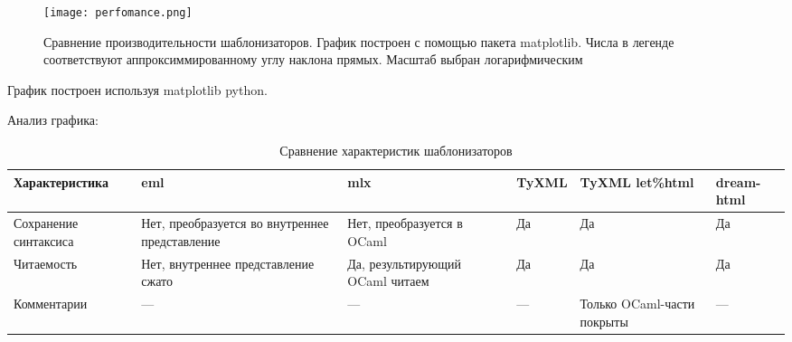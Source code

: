 
\begin{figure}
    \texttt{[image: perfomance.png]}
    \label{fig:perfomance}
    \caption{Сравнение производительности шаблонизаторов. График построен с помощью пакета matplotlib. Числа в легенде соответствуют аппроксиммированному углу наклона прямых. Масштаб выбран логарифмическим}
\end{figure}

График построен используя matplotlib python.

Анализ графика:

\begin{table}[h]
    \centering
    \caption{Сравнение характеристик шаблонизаторов}
    \label{tab:templates-comparison}
    \begin{tabular}{lp{3cm}p{3cm}p{2cm}p{3cm}p{2cm}}
        \toprule
        \textbf{Характеристика}                        & \textbf{eml} & \textbf{mlx} & \textbf{TyXML} & \textbf{TyXML let\%html} & \textbf{dream-html} \\
        \midrule
        Сохранение синтаксиса                          &
        Нет, преобразуется во внутреннее представление &
        Нет, преобразуется в OCaml                     &
        Да                                             &
        Да                                             &
        Да                                                                                                                                             \\

        Читаемость                                     &
        Нет, внутреннее представление сжато            &
        Да, результирующий OCaml читаем                &
        Да                                             &
        Да                                             &
        Да                                                                                                                                             \\

        Комментарии                                    &
        ---                                            &
        ---                                            &
        ---                                            &
        Только OCaml-части покрыты                     &
        ---                                                                                                                                            \\
        \bottomrule
    \end{tabular}
\end{table}